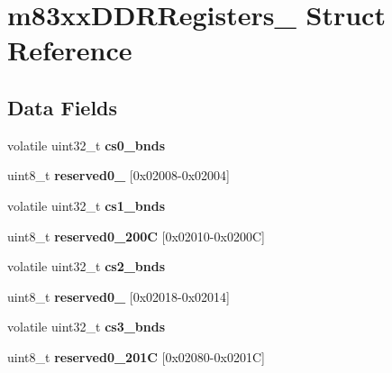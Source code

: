 \hypertarget{structm83xxDDRRegisters__}{}\section{m83xx\+D\+D\+R\+Registers\+\_\+ Struct Reference}
\label{structm83xxDDRRegisters__}
\subsection*{Data Fields}
\begin{DoxyCompactItemize}
\item 
\mbox{\label{structm83xxDDRRegisters___a29913a659c55638d294fd7f1a35d128f}} 
volatile uint32\+\_\+t {\bfseries cs0\+\_\+bnds}
\item 
\mbox{\label{structm83xxDDRRegisters___af04b5810cc7b9ffe8b955f7a34ae9a75}} 
uint8\+\_\+t {\bfseries reserved0\+\_} \mbox{[}0x02008-\/0x02004\mbox{]}
\item 
\mbox{\label{structm83xxDDRRegisters___abeb610554ad96b26ae3365dd7ee769e0}} 
volatile uint32\+\_\+t {\bfseries cs1\+\_\+bnds}
\item 
\mbox{\label{structm83xxDDRRegisters___aedfe5bc2a43e135f5b0c81210113eeb8}} 
uint8\+\_\+t {\bfseries reserved0\+\_\+200C} \mbox{[}0x02010-\/0x0200\+C\mbox{]}
\item 
\mbox{\label{structm83xxDDRRegisters___a487b9ec5b24fe6ab32e66d33826a0b97}} 
volatile uint32\+\_\+t {\bfseries cs2\+\_\+bnds}
\item 
\mbox{\label{structm83xxDDRRegisters___ad8d1120abdad671f64f1704fcf330cca}} 
uint8\+\_\+t {\bfseries reserved0\+\_} \mbox{[}0x02018-\/0x02014\mbox{]}
\item 
\mbox{\label{structm83xxDDRRegisters___a99f5b9a93f856cb2d9d845e6a3beacdd}} 
volatile uint32\+\_\+t {\bfseries cs3\+\_\+bnds}
\item 
\mbox{\label{structm83xxDDRRegisters___aa957a9bbcad0bb124d8097bbb091a19a}} 
uint8\+\_\+t {\bfseries reserved0\+\_\+201C} \mbox{[}0x02080-\/0x0201\+C\mbox{]}

\end{DoxyCompactItemize}
